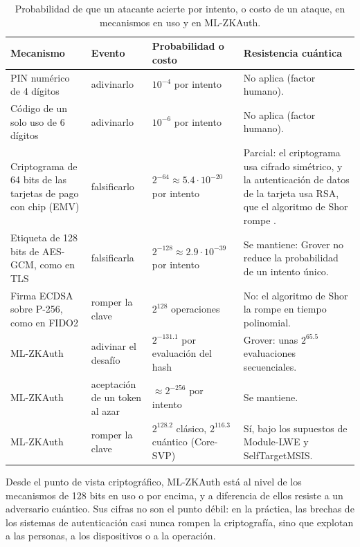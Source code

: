 \begin{table}[H]
\centering
\caption{Probabilidad de que un atacante acierte por intento, o costo de un ataque, en mecanismos en uso y en ML-ZKAuth.}
\label{tab:pqlite_industria}
\small
\begin{tabularx}{\textwidth}{>{\raggedright\arraybackslash}p{3.9cm}>{\raggedright\arraybackslash}p{1.9cm}>{\raggedright\arraybackslash}p{3.6cm}Y}
\toprule
\textbf{Mecanismo} & \textbf{Evento} & \textbf{Probabilidad o costo} & \textbf{Resistencia cuántica} \\
\midrule
PIN numérico de 4 dígitos & adivinarlo & $10^{-4}$ por intento & No aplica (factor humano). \\
Código de un solo uso de 6 dígitos & adivinarlo & $10^{-6}$ por intento & No aplica (factor humano). \\
Criptograma de 64 bits de las tarjetas de pago con chip (EMV) \cite{emvco2011book2} & falsificarlo & $2^{-64} \approx 5.4 \cdot 10^{-20}$ por intento & Parcial: el criptograma usa cifrado simétrico, y la autenticación de datos de la tarjeta usa RSA, que el algoritmo de Shor rompe \cite{emvco2011book2}. \\
Etiqueta de 128 bits de AES-GCM, como en TLS \cite{dworkin2007gcm} & falsificarla & $2^{-128} \approx 2.9 \cdot 10^{-39}$ por intento & Se mantiene: Grover no reduce la probabilidad de un intento único. \\
Firma ECDSA sobre P-256, como en FIDO2 \cite{fido_alliance, barker2020sp80057} & romper la clave & $2^{128}$ operaciones & No: el algoritmo de Shor la rompe en tiempo polinomial. \\
\midrule
ML-ZKAuth & adivinar el desafío & $2^{-131.1}$ por evaluación del hash & Grover: unas $2^{65.5}$ evaluaciones secuenciales. \\
ML-ZKAuth & aceptación de un token al azar & $\approx 2^{-256}$ por intento & Se mantiene. \\
ML-ZKAuth & romper la clave & $2^{128.2}$ clásico, $2^{116.3}$ cuántico (Core-SVP) & Sí, bajo los supuestos de Module-LWE y SelfTargetMSIS. \\
\bottomrule
\end{tabularx}
\end{table}

Desde el punto de vista criptográfico, ML-ZKAuth está al nivel de los mecanismos de 128 bits en uso o por encima, y a diferencia de ellos resiste a un adversario cuántico. Sus cifras no son el punto débil: en la práctica, las brechas de los sistemas de autenticación casi nunca rompen la criptografía, sino que explotan a las personas, a los dispositivos o a la operación.

